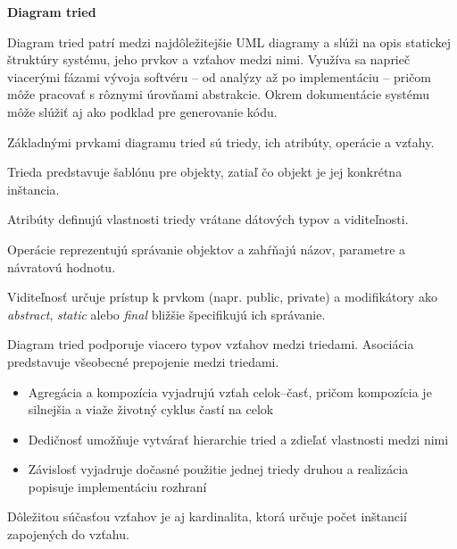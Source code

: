 
\textbf{Diagram tried}

Diagram tried patrí medzi najdôležitejšie UML diagramy a slúži na opis statickej štruktúry systému, jeho prvkov a vzťahov medzi nimi. Využíva sa naprieč viacerými fázami vývoja softvéru – od analýzy až po implementáciu – pričom môže pracovať s rôznymi úrovňami abstrakcie. Okrem dokumentácie systému môže slúžiť aj ako podklad pre generovanie kódu.


Základnými prvkami diagramu tried sú triedy, ich atribúty, operácie a vzťahy. 

Trieda predstavuje šablónu pre objekty, zatiaľ čo objekt je jej konkrétna inštancia. 

Atribúty definujú vlastnosti triedy vrátane dátových typov a viditeľnosti. 

Operácie reprezentujú správanie objektov a zahŕňajú názov, parametre a návratovú hodnotu. 

Viditeľnosť určuje prístup k prvkom (napr. public, private) a modifikátory ako \textit{abstract}, \textit{static} alebo \textit{final} bližšie špecifikujú ich správanie.

Diagram tried podporuje viacero typov vzťahov medzi triedami. Asociácia predstavuje všeobecné prepojenie medzi triedami. 

\begin{itemize}
    \item Agregácia a kompozícia vyjadrujú vzťah celok–časť, pričom kompozícia je silnejšia a viaže životný cyklus častí na celok
    \item Dedičnosť umožňuje vytvárať hierarchie tried a zdieľať vlastnosti medzi nimi
    \item Závislosť vyjadruje dočasné použitie jednej triedy druhou a realizácia popisuje implementáciu rozhraní
\end{itemize}
  
Dôležitou súčasťou vzťahov je aj kardinalita, ktorá určuje počet inštancií zapojených do vzťahu.%

